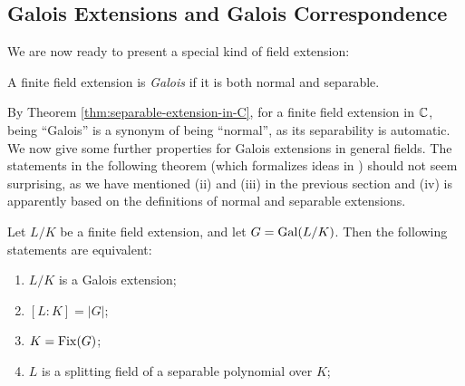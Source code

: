 
 \subsection{Galois Extensions and Galois Correspondence}


We are now ready to present a special kind of field extension:

\begin{definition}
    A finite field extension is \textit{Galois} if it is both normal and separable. 
\end{definition}

By Theorem \ref{thm:separable-extension-in-C}, for a finite field extension in $\mathbb C$, being ``Galois'' is a synonym of being ``normal'', as its separability is automatic. 
We now give some further properties for Galois extensions in general fields. The statements in the following theorem (which formalizes ideas in \cite{galois-theory-lectures}) should not seem surprising, as we have mentioned (ii) and (iii) in the previous section and (iv) is apparently based on the definitions of normal and separable extensions. 


\begin{theorem} \label{thm:fixed}
	Let $L/K$ be a finite field extension, and let $G = \operatorname{Gal}(L/K)$. Then the following statements are equivalent:
	\begin{enumerate}[label=(\roman*)]
		\item $L/K$ is a Galois extension;
		\item $[L:K] = |G|$;
		\item $K = \operatorname{Fix}(G)$;
		\item $L$ is a splitting field of a separable polynomial over $K$;
	\end{enumerate}
\end{theorem}


